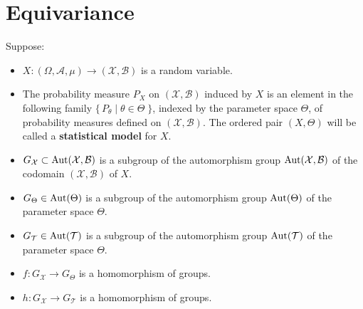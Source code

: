 
\newcommand{\Aut}{\textnormal{Aut}}

\section{Equivariance}
\setcounter{theorem}{0}

\begin{definition}\quad
Suppose:
\begin{itemize}
	\item $X : (\Omega,\mathcal{A},\mu) \longrightarrow (\mathcal{X},\mathcal{B})$ is a random
	      variable.

	\item The probability measure $P_{X}$ on $(\mathcal{X},\mathcal{B})$ induced by $X$ is an element
	      in the following family $\{\,P_{\theta}\;\vert\;\theta\in\Theta\;\}$, indexed by the
	      parameter space $\Theta$, of probability measures defined on $(\mathcal{X},\mathcal{B})$.
	      The ordered pair $(X,\Theta)$ will be called a \textbf{statistical model} for $X$.

	\item $G_{\mathcal{X}} \subset \Aut(\mathcal{X},\mathcal{B})$ is a subgroup of the automorphism
	      group $\Aut(\mathcal{X},\mathcal{B})$ of the codomain $(\mathcal{X},\mathcal{B})$ of $X$.

	\item $G_{\Theta} \in \Aut(\Theta)$ is a subgroup of the automorphism group $\Aut(\Theta)$ of
	the parameter space $\Theta$.

	\item $G_{\mathcal{T}} \in \Aut(\mathcal{T})$ is a subgroup of the automorphism group
	      $\Aut(\mathcal{T})$ of the parameter space $\Theta$.

	\item $f:G_{\mathcal{X}} \longrightarrow G_{\Theta}$ is a homomorphism of groups.

	\item $h:G_{\mathcal{X}} \longrightarrow G_{\mathcal{T}}$ is a homomorphism of groups.


\end{itemize}
\end{definition}
